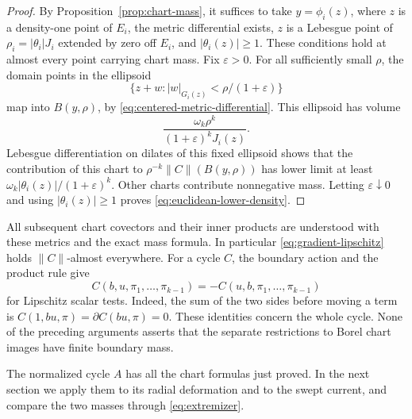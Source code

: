 \begin{proof}
By Proposition~\ref{prop:chart-mass}, it suffices to take
\(y=\phi_i(z)\), where \(z\) is a density-one point of \(E_i\), the
metric differential exists, \(z\) is a Lebesgue point of
\(\rho_i=|\theta_i|J_i\) extended by zero off \(E_i\), and
\(|\theta_i(z)|\ge1\). These conditions hold at almost every point
carrying chart mass. Fix \(\varepsilon>0\). For all sufficiently small
\(\rho\), the domain points in the ellipsoid
\[
 \{z+w:|w|_{G_i(z)}<\rho/(1+\varepsilon)\}
\]
map into \(B(y,\rho)\), by
\eqref{eq:centered-metric-differential}. This ellipsoid has volume
\[
 \frac{\omega_k\rho^k}{(1+\varepsilon)^kJ_i(z)}.
\]
Lebesgue differentiation on dilates of this fixed ellipsoid shows that
the contribution of this chart to \(\rho^{-k}\|C\|(B(y,\rho))\) has
lower limit at least
\(\omega_k|\theta_i(z)|/(1+\varepsilon)^k\).
Other charts contribute nonnegative mass. Letting
\(\varepsilon\downarrow0\) and using \(|\theta_i(z)|\ge1\) proves
\eqref{eq:euclidean-lower-density}.
\end{proof}

All subsequent chart covectors and their inner products are understood
with these metrics and the exact mass formula. In particular
\eqref{eq:gradient-lipschitz} holds \(\|C\|\)-almost everywhere.
For a cycle \(C\), the boundary action and the product rule give
\begin{equation}
\label{eq:cycle-product-rule}
 C(b,u,\pi_1,\ldots,\pi_{k-1})
 =-C(u,b,\pi_1,\ldots,\pi_{k-1})
\end{equation}
for Lipschitz scalar tests. Indeed, the sum of the two sides before
moving a term is \(C(1,bu,\pi)=\partial C(bu,\pi)=0\).
These identities concern the whole cycle. None of the preceding
arguments asserts that the separate restrictions to Borel chart images
have finite boundary mass.


The normalized cycle $A$ has all the chart formulas just proved. In the
next section we apply them to its radial deformation and to the swept
current, and compare the two masses through \eqref{eq:extremizer}.

